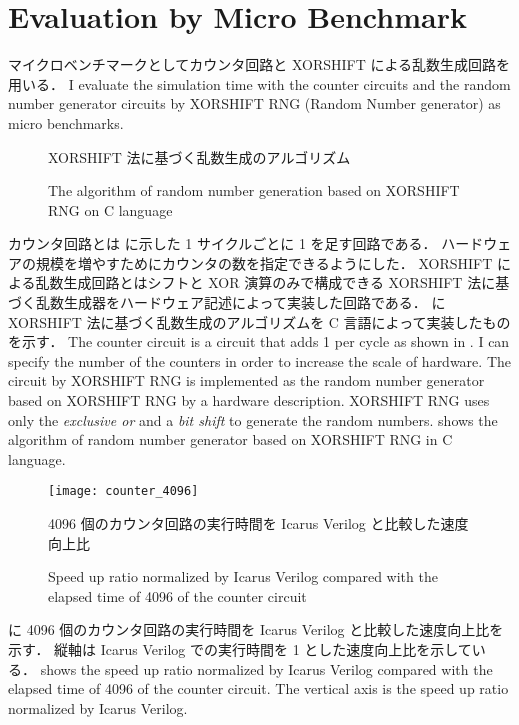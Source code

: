 \section{Evaluation by Micro Benchmark}

マイクロベンチマークとしてカウンタ回路と XORSHIFT による乱数生成回路を用いる．
\fi
I evaluate the simulation time with the counter circuits and the random number generator circuits by XORSHIFT RNG (Random Number generator) as micro benchmarks.

\begin{figure}[tb]
 
 \caption{XORSHIFT 法に基づく乱数生成のアルゴリズム}
\fi
 \caption{The algorithm of random number generation based on XORSHIFT RNG on C language}
 \label{src:xorshift_alg}
\end{figure}

カウンタ回路とは  に示した 1 サイクルごとに 1 を足す回路である．
ハードウェアの規模を増やすためにカウンタの数を指定できるようにした．
XORSHIFT による乱数生成回路とはシフトと XOR 演算のみで構成できる XORSHIFT 法に基づく乱数生成器をハードウェア記述によって実装した回路である．
 に XORSHIFT 法に基づく乱数生成のアルゴリズムを C 言語によって実装したものを示す．
\fi
The counter circuit is a circuit that adds 1 per cycle as shown in .
I can specify the number of the counters in order to increase the scale of hardware.
The circuit by XORSHIFT RNG is implemented as the random number generator based on XORSHIFT RNG by a hardware description.
XORSHIFT RNG uses only the \textit{exclusive or} and a \textit{bit shift} to generate the random numbers.
 shows the algorithm of random number generator based on XORSHIFT RNG in C language.

\begin{figure}[tb]
 \centering
 \texttt{[image: counter\_4096]}
 \caption{4096 個のカウンタ回路の実行時間を Icarus Verilog と比較した速度向上比}
\fi
 \caption{Speed up ratio normalized by Icarus Verilog compared with the elapsed time of 4096 of the counter circuit}
 \label{fig:counter4096}
\end{figure}

 に 4096 個のカウンタ回路の実行時間を Icarus Verilog と比較した速度向上比を示す．
縦軸は Icarus Verilog での実行時間を 1 とした速度向上比を示している．
\fi
{} shows the speed up ratio normalized by Icarus Verilog compared with the elapsed time of 4096 of the counter circuit.
The vertical axis is the speed up ratio normalized by Icarus Verilog.

